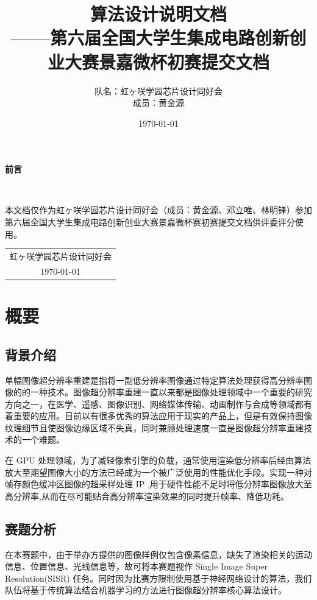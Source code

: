 \documentclass[12pt, a4paper, oneside]{ctexbook}
\title{{\Huge{\textbf{算法设计说明文档}}}\normalsize{\\——第六届全国大学生集成电路创新创业大赛景嘉微杯初赛提交文档}}
\author{队名：虹ヶ咲学园芯片设计同好会\\ 成员：黄金源\space邓立唯\space林明锋}
\date{\today}
\begin{document}
	\maketitle	
	\setcounter{page}{1}
	\begin{center}
		\Huge\textbf{前言}
	\end{center}~\
	
	本文档仅作为虹ヶ咲学园芯片设计同好会（成员：黄金源、邓立唯、林明锋）参加第六届全国大学生集成电路创新创业大赛景嘉微杯赛初赛提交文档供评委评分使用。
	~\\
	\begin{flushright}
		\begin{tabular}{c}
			虹ヶ咲学园芯片设计同好会\\
			\today
		\end{tabular}
	\end{flushright}
	\newpage
	\setcounter{page}{1}
	\tableofcontents
	\newpage
	\setcounter{page}{1}
	
	\chapter{概要}
	\section{背景介绍}
	单幅图像超分辨率重建是指将一副低分辨率图像通过特定算法处理获得高分辨率图像的的一种技术。图像超分辨率重建一直以来都是图像处理领域中一个重要的研究方向之一，在医学、遥感、图像识别、网络媒体传输、动画制作与合成等领域都有着重要的应用。目前以有很多优秀的算法应用于现实的产品上，但是有效保持图像纹理细节且使图像边缘区域不失真，同时兼顾处理速度一直是图像超分辨率重建技术的一个难题。\par 在 GPU 处理领域，为了减轻像素引擎的负载，通常使用渲染低分辨率后经由算法放大至期望图像大小的方法已经成为一个被广泛使用的性能优化手段。实现一种对帧存颜色缓冲区图像的超采样处理 IP ,用于硬件性能不足时将低分辨率图像放大至高分辨率,从而在尽可能贴合高分辨率渲染效果的同时提升帧率、降低功耗。
	\section{赛题分析}
	在本赛题中，由于举办方提供的图像样例仅包含像素信息，缺失了渲染相关的运动信息、位置信息、光线信息等，故可将本赛题视作 Single Image Super Resolution(SISR) 任务。同时因为比赛方限制使用基于神经网络设计的算法，我们队伍将基于传统算法结合机器学习的方法进行图像超分辨率核心算法设计。
	
\end{document}

